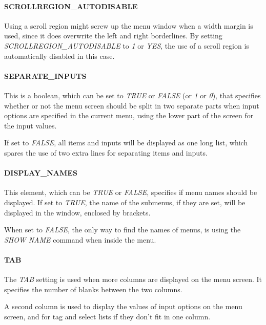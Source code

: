 \documentclass[a4paper]{book}
\begin{document}
\paragraph{SCROLLREGION{\_}AUTODISABLE}

Using a scroll region might screw up the menu window when a width margin is 
used, since it does overwrite the left and right borderlines. By setting 
\textsl{SCROLLREGION{\_}AUTODISABLE} to \textsl{1} or \textsl{YES}, the use of a scroll region is 
automatically disabled in this case.

\paragraph{SEPARATE{\_}INPUTS}

This is a boolean, which can be set to \textsl{TRUE} or \textsl{FALSE} (or \textsl{1} or \textsl{0}), that 
specifies whether or not the menu screen should be split in two separate 
parts when input options are specified in the current menu, using the lower 
part of the screen for the input values.

If set to \textsl{FALSE}, all items and inputs will be displayed as one long list, 
which spares the use of two extra lines for separating items and inputs.

\paragraph{DISPLAY{\_}NAMES}

This element, which can be \textsl{TRUE} or \textsl{FALSE}, specifies if menu names should be 
displayed. If set to \textsl{TRUE}, the name of the submenus, if they are set, will 
be displayed in the window, enclosed by brackets.

When set to \textsl{FALSE}, the only way to find the names of menus, is using the 
\textsl{SHOW NAME} command 
when inside the menu.

\paragraph{TAB}

The \textsl{TAB} setting is used when more columns are displayed on the menu screen. 
It specifies the number of blanks between the two columns.

A second column is used to display the values of input options on the menu 
screen, and for tag and select lists if they don't fit in one column.
\end{document}

